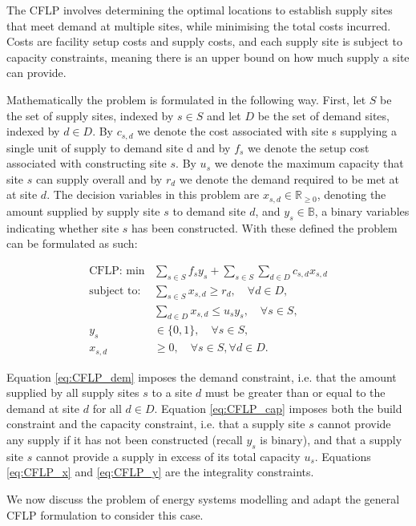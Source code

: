 The CFLP involves determining the optimal locations to establish supply sites that meet demand at multiple
sites, while minimising the total costs incurred. Costs are facility setup costs and supply costs,
and each supply site is subject to capacity constraints, meaning there is an upper bound on how much 
supply a site can provide.

Mathematically the problem is formulated in the following way. First, let $S$ be the set of supply sites, 
indexed by $s \in S$ and let $D$ be the set of demand sites, indexed by $d \in D$. By $c_{s,d}$ we 
denote the cost associated with site s supplying a single unit of supply to demand site d and by 
$f_s$ we denote the setup cost associated with constructing site $s$.
By $u_s$ we denote the maximum capacity that site $s$ can supply overall and by $r_d$ we denote the demand 
required to be met at at site $d$. The decision variables in this problem are $x_{s,d} \in \mathbb{R}_{\geq 0}$, denoting the amount 
supplied by supply site $s$ to demand site $d$, and $y_s \in \mathbb{B}$, a binary variables indicating whether site 
$s$ has been constructed. With these defined the problem can be formulated as such:

\begin{subequations}\label{eq:CFLP}
    \begin{align}
    \text{CFLP: } \min & \sum_{s \in S} f_s y_s + \sum_{s \in S}\sum_{d \in D} c_{s,d} x_{s,d} \label{eq:CFLP_obj}\\
    \text{subject to: } &\sum_{s \in S} x_{s,d} \geq r_d, \quad \forall d \in D,\label{eq:CFLP_dem}\\
    &\sum_{d \in D} x_{s,d} \leq u_s y_s, \quad \forall s \in S,\label{eq:CFLP_cap}\\
    y_s &\in \{0, 1\}, \quad \forall s \in S,\label{eq:CFLP_y}\\
    x_{s,d} &\geq 0, \quad \forall s \in S, \forall d \in D.\label{eq:CFLP_x}
    \end{align}
\end{subequations}


Equation \ref{eq:CFLP_dem} imposes the demand constraint, i.e. that the amount supplied by all supply sites $s$ 
to a site $d$ must be greater than or equal to the demand at site $d$ for all $d \in D$. Equation \ref{eq:CFLP_cap} 
imposes both the build constraint and the capacity constraint, i.e. that a supply site $s$ cannot provide any supply
if it has not been constructed (recall $y_s$ is binary), and that a supply site $s$ 
cannot provide a supply in excess of its total capacity $u_s$. Equations \ref{eq:CFLP_x} and 
\ref{eq:CFLP_y} are the integrality constraints. 

We now discuss the problem of energy systems modelling and adapt the general CFLP formulation to 
consider this case.